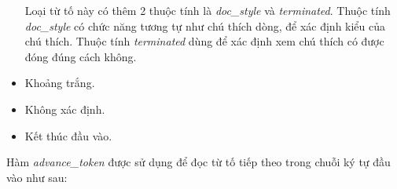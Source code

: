 \begin{itemize}

        Loại từ tố này có thêm 2 thuộc tính là \textit{doc\_style} và \textit{terminated}. Thuộc tính \textit{doc\_style} có chức năng tương tự như chú thích dòng, để xác định kiểu của chú thích. Thuộc tính \textit{terminated} dùng để xác định xem chú thích có được đóng đúng cách không.
  \item Khoảng trắng.


  \item Không xác định.
            
            
  \item Kết thúc đầu vào.
            
\end{itemize}

Hàm \textit{advance\_token} được sử dụng để đọc từ tố tiếp theo trong chuỗi ký tự đầu vào như sau:

